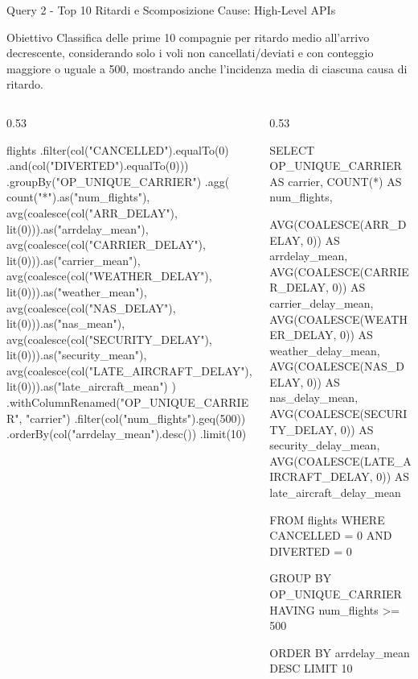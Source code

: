 \documentclass[10pt, aspectratio=169]{beamer}
\newcommand{\queryobjective}[1]{
    \vspace{-0.5cm}
    \begin{exampleblock}{\footnotesize Obiettivo}
    \scriptsize #1
    \end{exampleblock}
    \vfill
}
\begin{document}
\begin{frame}[fragile, t]{Query 2 - Top 10 Ritardi e Scomposizione Cause: High-Level APIs}

    \queryobjective{Classifica delle prime 10 compagnie per ritardo medio all'arrivo decrescente, considerando solo i voli non cancellati/deviati e con conteggio maggiore o uguale a 500, mostrando anche l'incidenza media di ciascuna causa di ritardo.}

    \begin{columns}[c]

        \begin{column}{0.53\textwidth}
            \begin{dataframecodebox}
flights
  .filter(col("CANCELLED").equalTo(0)
            .and(col("DIVERTED").equalTo(0)))
  .groupBy("OP_UNIQUE_CARRIER")
  .agg(
    count("*").as("num_flights"),
    avg(coalesce(col("ARR_DELAY"), lit(0))).as("arrdelay_mean"),
    avg(coalesce(col("CARRIER_DELAY"), lit(0))).as("carrier_mean"),
    avg(coalesce(col("WEATHER_DELAY"), lit(0))).as("weather_mean"),
    avg(coalesce(col("NAS_DELAY"), lit(0))).as("nas_mean"),
    avg(coalesce(col("SECURITY_DELAY"), lit(0))).as("security_mean"),
    avg(coalesce(col("LATE_AIRCRAFT_DELAY"), lit(0))).as("late_aircraft_mean")
  )
  .withColumnRenamed("OP_UNIQUE_CARRIER", "carrier")
  .filter(col("num_flights").geq(500))
  .orderBy(col("arrdelay_mean").desc())
  .limit(10)
            \end{dataframecodebox}
        \end{column}

        \begin{column}{0.53\textwidth}
            \begin{sqlcodebox}
SELECT
  OP_UNIQUE_CARRIER AS carrier,
  COUNT(*)          AS num_flights,

  AVG(COALESCE(ARR_DELAY, 0))           AS arrdelay_mean,
  AVG(COALESCE(CARRIER_DELAY, 0))       AS carrier_delay_mean,
  AVG(COALESCE(WEATHER_DELAY, 0))       AS weather_delay_mean,
  AVG(COALESCE(NAS_DELAY, 0))           AS nas_delay_mean,
  AVG(COALESCE(SECURITY_DELAY, 0))      AS security_delay_mean,
  AVG(COALESCE(LATE_AIRCRAFT_DELAY, 0)) AS late_aircraft_delay_mean

FROM flights
WHERE CANCELLED = 0 AND DIVERTED = 0

GROUP BY OP_UNIQUE_CARRIER
HAVING num_flights >= 500

ORDER BY arrdelay_mean DESC
LIMIT 10
            \end{sqlcodebox}
        \end{column}

    \end{columns}

\end{frame}
\end{document}
